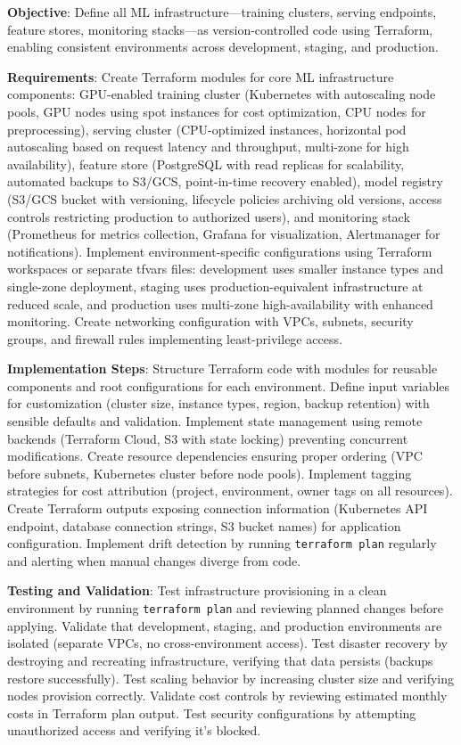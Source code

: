 \textbf{Objective}: Define all ML infrastructure---training clusters, serving endpoints, feature stores, monitoring stacks---as version-controlled code using Terraform, enabling consistent environments across development, staging, and production.

\textbf{Requirements}: Create Terraform modules for core ML infrastructure components: GPU-enabled training cluster (Kubernetes with autoscaling node pools, GPU nodes using spot instances for cost optimization, CPU nodes for preprocessing), serving cluster (CPU-optimized instances, horizontal pod autoscaling based on request latency and throughput, multi-zone for high availability), feature store (PostgreSQL with read replicas for scalability, automated backups to S3/GCS, point-in-time recovery enabled), model registry (S3/GCS bucket with versioning, lifecycle policies archiving old versions, access controls restricting production to authorized users), and monitoring stack (Prometheus for metrics collection, Grafana for visualization, Alertmanager for notifications). Implement environment-specific configurations using Terraform workspaces or separate tfvars files: development uses smaller instance types and single-zone deployment, staging uses production-equivalent infrastructure at reduced scale, and production uses multi-zone high-availability with enhanced monitoring. Create networking configuration with VPCs, subnets, security groups, and firewall rules implementing least-privilege access.

\textbf{Implementation Steps}: Structure Terraform code with modules for reusable components and root configurations for each environment. Define input variables for customization (cluster size, instance types, region, backup retention) with sensible defaults and validation. Implement state management using remote backends (Terraform Cloud, S3 with state locking) preventing concurrent modifications. Create resource dependencies ensuring proper ordering (VPC before subnets, Kubernetes cluster before node pools). Implement tagging strategies for cost attribution (project, environment, owner tags on all resources). Create Terraform outputs exposing connection information (Kubernetes API endpoint, database connection strings, S3 bucket names) for application configuration. Implement drift detection by running \texttt{terraform plan} regularly and alerting when manual changes diverge from code.

\textbf{Testing and Validation}: Test infrastructure provisioning in a clean environment by running \texttt{terraform plan} and reviewing planned changes before applying. Validate that development, staging, and production environments are isolated (separate VPCs, no cross-environment access). Test disaster recovery by destroying and recreating infrastructure, verifying that data persists (backups restore successfully). Test scaling behavior by increasing cluster size and verifying nodes provision correctly. Validate cost controls by reviewing estimated monthly costs in Terraform plan output. Test security configurations by attempting unauthorized access and verifying it's blocked.

